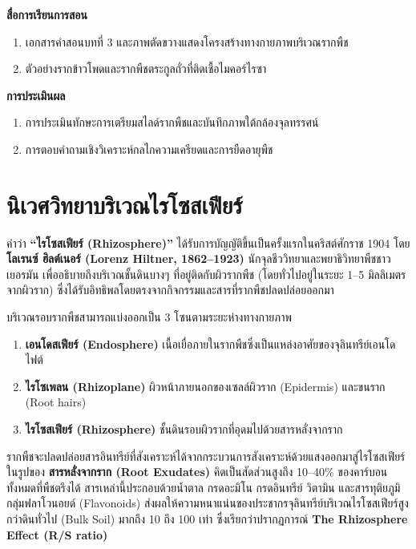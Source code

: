 \noindent\textbf{สื่อการเรียนการสอน}
\begin{enumerate}
    \item เอกสารคำสอนบทที่ 3 และภาพตัดขวางแสดงโครงสร้างทางกายภาพบริเวณรากพืช
    \item ตัวอย่างรากข้าวโพดและรากพืชตระกูลถั่วที่ติดเชื้อไมคอร์ไรซา
\end{enumerate}

\noindent\textbf{การประเมินผล}
\begin{enumerate}
    \item การประเมินทักษะการเตรียมสไลด์รากพืชและบันทึกภาพใต้กล้องจุลทรรศน์
    \item การตอบคำถามเชิงวิเคราะห์กลไกความเครียดและการยืดอายุพืช
\end{enumerate}

\newpage


\section{นิเวศวิทยาบริเวณไรโซสเฟียร์}

คำว่า \textbf{“ไรโซสเฟียร์ (Rhizosphere)”} ได้รับการบัญญัติขึ้นเป็นครั้งแรกในคริสต์ศักราช 1904 โดย \textbf{โลเรนซ์ ฮิลต์เนอร์ (Lorenz Hiltner, 1862--1923)} นักจุลชีววิทยาและพยาธิวิทยาพืชชาวเยอรมัน เพื่ออธิบายถึงบริเวณชั้นดินบางๆ ที่อยู่ติดกับผิวรากพืช (โดยทั่วไปอยู่ในระยะ 1--5 มิลลิเมตรจากผิวราก) ซึ่งได้รับอิทธิพลโดยตรงจากกิจกรรมและสารที่รากพืชปลดปล่อยออกมา

บริเวณรอบรากพืชสามารถแบ่งออกเป็น 3 โซนตามระยะห่างทางกายภาพ
\begin{enumerate}
    \item \textbf{เอนโดสเฟียร์ (Endosphere)} เนื้อเยื่อภายในรากพืชซึ่งเป็นแหล่งอาศัยของจุลินทรีย์เอนโดไฟต์
    \item \textbf{ไรโซเพลน (Rhizoplane)} ผิวหน้าภายนอกของเซลล์ผิวราก (Epidermis) และขนราก (Root hairs)
    \item \textbf{ไรโซสเฟียร์ (Rhizosphere)} ชั้นดินรอบผิวรากที่อุดมไปด้วยสารหลั่งจากราก
\end{enumerate}

รากพืชจะปลดปล่อยสารอินทรีย์ที่สังเคราะห์ได้จากกระบวนการสังเคราะห์ด้วยแสงออกมาสู่ไรโซสเฟียร์ในรูปของ \textbf{สารหลั่งจากราก (Root Exudates)} คิดเป็นสัดส่วนสูงถึง 10--40\% ของคาร์บอนทั้งหมดที่พืชตรึงได้ สารเหล่านี้ประกอบด้วยน้ำตาล กรดอะมิโน กรดอินทรีย์ วิตามิน และสารทุติยภูมิกลุ่มฟลาโวนอยด์ (Flavonoids) ส่งผลให้ความหนาแน่นของประชากรจุลินทรีย์บริเวณไรโซสเฟียร์สูงกว่าดินทั่วไป (Bulk Soil) มากถึง 10 ถึง 100 เท่า ซึ่งเรียกว่าปรากฏการณ์ \textbf{The Rhizosphere Effect (R/S ratio)}

